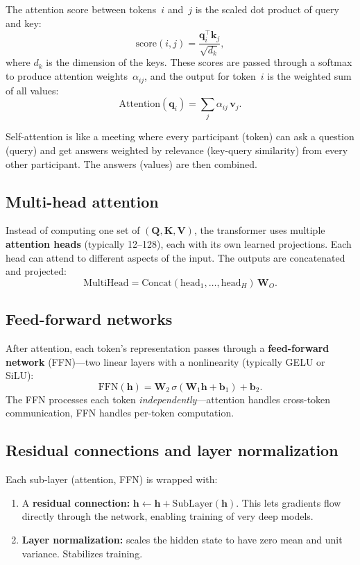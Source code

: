 \documentclass[11pt, twoside, openright]{memoir}
\begin{document}
The attention score between tokens~$i$ and~$j$ is the scaled dot product of
query and key:
\[
  \text{score}(i, j) = \frac{\mathbf{q}_i^\top \mathbf{k}_j}{\sqrt{d_k}},
\]
where $d_k$ is the dimension of the keys.  These scores are passed through
a softmax to produce attention weights~$\alpha_{ij}$, and the output for
token~$i$ is the weighted sum of all values:
\[
  \text{Attention}(\mathbf{q}_i) = \sum_{j} \alpha_{ij} \, \mathbf{v}_j.
\]

\begin{analogy}
Self-attention is like a meeting where every participant (token) can ask a
question (query) and get answers weighted by relevance (key-query similarity)
from every other participant.  The answers (values) are then combined.
\end{analogy}

\subsection{Multi-head attention}

Instead of computing one set of $(\mathbf{Q}, \mathbf{K}, \mathbf{V})$,
the transformer uses multiple \textbf{attention heads} (typically 12--128),
each with its own learned projections.  Each head can attend to different
aspects of the input.  The outputs are concatenated and projected:
\[
  \text{MultiHead} = \text{Concat}(\text{head}_1, \ldots, \text{head}_H)
  \, \mathbf{W}_O.
\]

\subsection{Feed-forward networks}

After attention, each token's representation passes through a
\textbf{feed-forward network} (FFN)---two linear layers with a nonlinearity
(typically GELU or SiLU):
\[
  \text{FFN}(\mathbf{h}) = \mathbf{W}_2 \, \sigma(\mathbf{W}_1 \mathbf{h}
  + \mathbf{b}_1) + \mathbf{b}_2.
\]
The FFN processes each token \emph{independently}---attention handles
cross-token communication, FFN handles per-token computation.

\subsection{Residual connections and layer normalization}

Each sub-layer (attention, FFN) is wrapped with:
\begin{enumerate}[nosep]
\item A \textbf{residual connection:} $\mathbf{h} \leftarrow \mathbf{h}
  + \text{SubLayer}(\mathbf{h})$.  This lets gradients flow directly
  through the network, enabling training of very deep models.
\item \textbf{Layer normalization:} scales the hidden state to have zero
  mean and unit variance.  Stabilizes training.
\end{enumerate}
\end{document}
